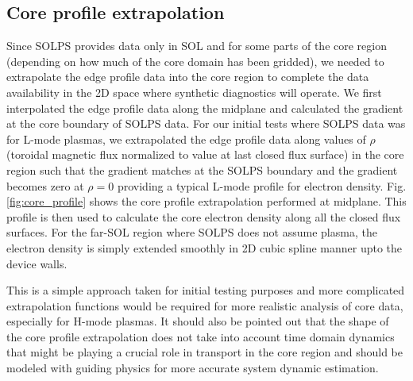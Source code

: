 \subsection{Core profile extrapolation}
Since SOLPS provides data only in \ac{SOL} and for some parts of the core region (depending on how much of the core domain has been gridded), we needed to extrapolate the edge profile data into the core region to complete the data availability in the 2D space where synthetic diagnostics will operate. We first interpolated the edge profile data along the midplane and calculated the gradient at the core boundary of SOLPS data. For our initial tests where SOLPS data was for L-mode plasmas, we extrapolated the edge profile data along values of $\rho$ (toroidal magnetic flux normalized to value at last closed flux surface) in the core region such that the gradient matches at the SOLPS boundary and the gradient becomes zero at $\rho=0$ providing a typical L-mode profile for electron density. Fig. \ref{fig:core_profile} shows the core profile extrapolation performed at midplane. This profile is then used to calculate the core electron density along all the closed flux surfaces. For the far-SOL region where SOLPS does not assume plasma, the electron density is simply extended smoothly in 2D cubic spline manner upto the device walls.

This is a simple approach taken for initial testing purposes and more complicated extrapolation functions would be required for more realistic analysis of core data, especially for H-mode plasmas. It should also be pointed out that the shape of the core profile extrapolation does not take into account time domain dynamics that might be playing a crucial role in transport in the core region and should be modeled with guiding physics for more accurate system dynamic estimation.

